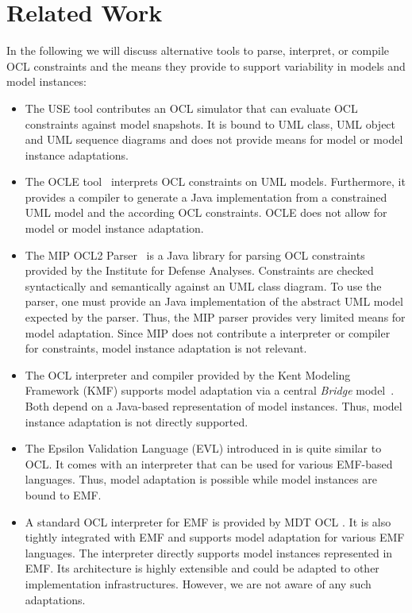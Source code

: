 \section{Related Work}
In the following we will discuss alternative tools to parse,
interpret, or compile OCL constraints and the means they provide
to support variability in models and model instances:

\begin{itemize}
  
\item The USE tool \cite{gogolla2007use} contributes an OCL simulator that can
evaluate OCL constraints against model snapshots. It is bound to UML class, UML object and
UML sequence diagrams and does not provide means for model or model instance
adaptations.

\item The OCLE tool~\cite{WWW:OCLE} interprets OCL constraints on
UML models. Furthermore, it provides a compiler to generate a Java
implementation from a constrained UML model and the according OCL 
constraints. OCLE does not allow for model or model instance adaptation.

\item The MIP OCL2 Parser~\cite{WWW:MIP} is a Java library for parsing OCL
constraints provided by the Institute for Defense Analyses. Constraints are
checked syntactically and semantically against an UML class diagram.
To use the parser, one must provide an Java implementation of the abstract 
UML model expected by the parser. Thus,
the MIP parser provides very limited means for model adaptation. Since MIP does
not contribute a interpreter or compiler for constraints, model
instance adaptation is not relevant.

\item The OCL interpreter and compiler provided by the Kent Modeling Framework
(KMF) supports model adaptation via a central \emph{Bridge}
model~\cite{akehurst2003ocl}. Both depend on a Java-based
representation of model instances. Thus, model instance adaptation is not
directly supported.

\item The Epsilon Validation Language (EVL) introduced in
\cite{kolovos2008detecting} is quite similar to OCL. It comes with an
interpreter that can be used for various EMF-based languages. Thus, model
adaptation is possible while model instances are bound to EMF.
 
\item A standard OCL interpreter for EMF is provided by MDT OCL
\cite{WWW:MDT}. It is also tightly integrated with EMF and supports 
model adaptation for various EMF languages. The interpreter directly supports
model instances represented in EMF. Its architecture is highly extensible
 and could be adapted to other implementation
infrastructures. However, we are not aware of any such adaptations.

\end{itemize}


